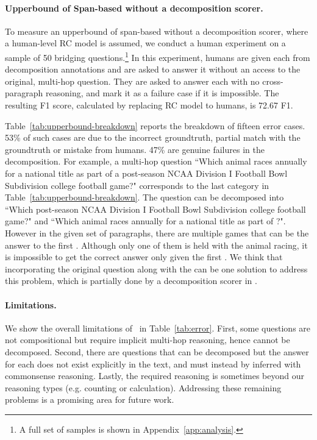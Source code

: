 \paragraph{Upperbound of Span-based \Queries{} without a decomposition scorer.}
To measure an upperbound of span-based \queries{} without a decomposition scorer, where a human-level RC model is assumed, we conduct a human experiment on a sample of 50 bridging questions.\footnote{A full set of samples is shown in Appendix~\ref{app:analysis}.} In this experiment, humans are given each \query{} from decomposition annotations and are asked to answer it without an access to the original, multi-hop question.
They are asked to answer each \query{} with no cross-paragraph reasoning, and mark it as a failure case if it is impossible.
The resulting F1 score, calculated by replacing RC model to humans, is 72.67 F1.

Table~\ref{tab:upperbound-breakdown} reports the breakdown of fifteen error cases. 53\% of such cases are due to the incorrect groundtruth, partial match with the groundtruth or mistake from humans. 47\% are genuine failures in the decomposition. For example, a multi-hop question ``Which animal races annually for a national title as part of a post-season NCAA  Division I Football Bowl Subdivision college football game?" corresponds to the last category in Table~\ref{tab:upperbound-breakdown}. The question can be decomposed into ``Which post-season NCAA Division I Football Bowl Subdivision college football game?" and
``Which animal races annually for a national title as part of \answer{}?". However in the given set of paragraphs, there are multiple games that can be the answer to the first \query{}. Although only one of them is held with the animal racing, it is impossible to get the correct answer only given the first \query{}. We think that incorporating the original question along with the \queries{} can be one solution to address this problem, which is partially done by a decomposition scorer in \sys.

\vspace{-.1cm}
\paragraph{Limitations.}
We show the overall limitations of \sys\ in Table~\ref{tab:error}. First, some questions are not compositional but require implicit multi-hop reasoning, hence cannot be decomposed. Second, there are questions that can be decomposed but the answer for each \query{} does not exist explicitly in the text, and must instead by inferred with commonsense reasoning. Lastly, the required reasoning is sometimes beyond our reasoning types (e.g. counting or calculation). Addressing these remaining problems is a promising area for future work.